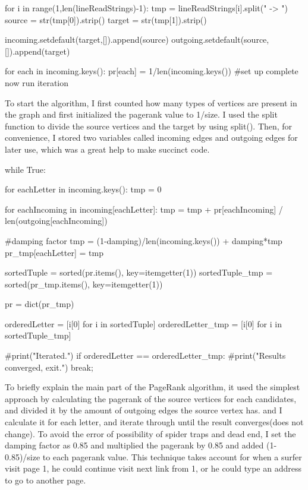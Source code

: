 \documentclass{article}
\begin{document}
\begin{python}
for i in range(1,len(lineReadStrings)-1):
    tmp = lineReadStrings[i].split(" -> ")
    source = str(tmp[0]).strip()
    target = str(tmp[1]).strip()
    
    incoming.setdefault(target,[]).append(source)
    outgoing.setdefault(source,[]).append(target)
    
for each in incoming.keys():
    pr[each] = 1/len(incoming.keys())
#set up complete now run iteration
\end{python}
To start the algorithm, I first counted how many types of vertices are present in the graph and first initialized the pagerank value to 1/size. I used the split function to divide the source vertices and the target by using split(). Then, for convenience, I stored two variables called incoming edges and outgoing edges for later use, which was a great help to make succinct code.
\begin{python}

    
while True:
    
    for eachLetter in incoming.keys():
        tmp = 0

        for eachIncoming in incoming[eachLetter]:
            tmp = tmp + pr[eachIncoming] / len(outgoing[eachIncoming])
            
        #damping factor
        tmp = (1-damping)/len(incoming.keys()) + damping*tmp
        pr_tmp[eachLetter] = tmp
    
    sortedTuple = sorted(pr.items(), key=itemgetter(1))
    sortedTuple_tmp = sorted(pr_tmp.items(), key=itemgetter(1))
    
    pr = dict(pr_tmp)

    orderedLetter = [i[0] for i in sortedTuple]
    orderedLetter_tmp = [i[0] for i in sortedTuple_tmp]
    
    #print("Iterated.")
    if orderedLetter == orderedLetter_tmp:
        #print("Results converged, exit.")
        break;
\end{python}
To briefly explain the main part of the PageRank algorithm, it used the simplest approach by calculating the pagerank of the source vertices for each candidates, and divided it by the amount of outgoing edges the source vertex has. and I calculate it for each letter, and iterate through until the result converges(does not change). To avoid the error of possibility of spider traps and dead end, I set the damping factor as 0.85 and multiplied the pagerank by 0.85 and added (1-0.85)/size to each pagerank value. This technique takes account for when a surfer visit page 1, he could continue visit next link from 1, or he could type an address to go to another page. 
\end{document}
